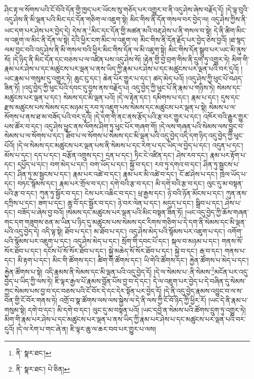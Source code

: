 ཤིང་རྟ་ལ་སོགས་པའི་ངོ་བོའི་དོན་གྱི་ཁྱད་པར་ཡོངས་སུ་གཅོད་པར་འགྱུར་བ་ནི་འདུ་ཤེས་ཞེས་བརྗོད་དོ། །དེ་ལྟ་བུའི་འདུ་ཤེས་ནི་མི་ལྡན་པའི་མིང་དང་དོན་གཅིག་ལ་འཇུག་སྟེ། མིང་གིས་ནི་དོན་གསལ་བར་བྱེད་ལ། འདུ་ཤེས་ཀྱིས་ནི་ཡང་དག་པར་ཤེས་པར་བྱེད་དེ། དེས་ན་\footnote{ནི་  སྣར་ཐང་། }མིང་དང་དོན་གྱི་མཚན་མའི་བརྡ་ཤེས་པ་ནི་གསལ་བ་སྟེ། དེ་ནི་ཚིག་མིང་ལ་འཇུག་ལ་མིང་ནི་དོན་ལ་སྟེ། དེའི་ཕྱིར་ངག་མིང་ལ་འཇུག་ལ། མིང་གིས་ནི་དོན་རྗོད་པར་བྱེད་ཅེས་བྱའོ། །ཐ་སྙད་ལམ་བྱང་བའི་འདུ་ཤེས་ནི་མི་གསལ་བའི་ཕྱིར་མིང་གིས་དོན་ལ་མི་འཇུག་སྟེ། མིང་གིས་དོན་སྒྲུབ་པར་ཡང་མི་ནུས་སོ། །དེ་ཉིད་ནི་མིང་དོན་དང་བཅས་པ་ལ་འཛིན་པས་འདུ་ཤེས་སོ། །རྟེན་གྱི་བྱེ་བྲག་གིས་ནི་དྲུག་ཏུ་འགྱུར་ཏེ། མིག་གི་རྣམ་པར་ཤེས་པ་དང་མཚུངས་པར་ལྡན་པ་ནས་ཡིད་ཀྱི་རྣམ་པར་ཤེས་པ་དང་མཚུངས་པར་ལྡན་པའི་བར་དུའོ། །ཡང་རྣམ་པ་གསུམ་དུ་འགྱུར་ཏེ། ཆུང་ངུ་དང་། ཆེན་པོར་གྱུར་པ་དང་། ཚད་མེད་པའོ། །འདུ་ཤེས་ཀྱི་ཕུང་པོ་བཤད་ཟིན་ཏོ། །འདུ་བྱེད་ཀྱི་ཕུང་པོའི་དབང་དུ་བྱས་ནས་བརྗོད་པ། འདུ་བྱེད་ཀྱི་ཕུང་པོ་ནི་རྣམ་པ་གཉིས་ཏེ། སེམས་དང་མཚུངས་པར་ལྡན་པ་དང་། སེམས་དང་མི་ལྡན་པའོ། །དེ་ལ་རྟེན་དང་། དམིགས་པ་དང་། རྣམ་པ་དང་། དུས་དང་རྫས་མཚུངས་པས་སེམས་དང་མཉམ་དུ་རབ་ཏུ་འཇུག་པས་སེམས་དང་མཚུངས་པར་ལྡན་པ་སྟེ། སེམས་པ་ལ་སོགས་པ་ནས་ཐ་མ་བཟོད་པའི་བར་དུའོ། །དེ་དག་གི་ནང་ནས་རྩོད་པའི་རྩ་བར་གྱུར་པ་དང་། འཁོར་བའི་རྒྱུར་གྱུར་པས་ཚོར་བ་དང་། འདུ་ཤེས་ཕྱུང་ནས་ལོགས་ཤིག་ཏུ་ཕུང་པོར་གཞག་གོ། །དེ་ལས་གཞན་པའི་སེམས་ལས་བྱུང་བ་སེམས་པ་ལ་སོགས་པ་དང་། ཐོབ་པ་ལ་སོགས་པ་སེམས་དང་མི་ལྡན་པའི་འདུ་བྱེད་འདི་དག་ཉིད་འདུ་བྱེད་ཀྱི་ཕུང་པོའོ། །དེ་ལ་སེམས་དང་མཚུངས་པར་ལྡན་པས་ནི་སེམས་པ་དང་རེག་པ་དང་ཡིད་ལ་བྱེད་པ་དང་། འདུན་པ་དང་། མོས་པ་དང་། དད་པ་དང་། བརྩོན་འགྲུས་དང་། དྲན་པ་དང་། ཏིང་ངེ་འཛིན་དང་། ཤེས་རབ་དང་། རྣམ་པར་རྟོག་པ་དང་། དཔྱོད་པ་དང་། བག་མེད་པ་དང་། བག་ཡོད་པ་དང་། སྐྱོ་བ་དང་། རབ་ཏུ་དགའ་བ་དང་། ཤིན་ཏུ་སྦྱངས་པ་དང་། ཤིན་ཏུ་མ་སྦྱངས་པ་དང་། རྣམ་པར་འཚེ་བ་དང་། རྣམ་པར་མི་འཚེ་བ་དང་། ངོ་ཚ་ཤེས་པ་དང་། ཁྲེལ་ཡོད་པ་དང་། བཏང་སྙོམས་དང་། རྣམ་པར་གྲོལ་བ་དང་། དགེ་བའི་རྩ་བ་དང་། མི་དགེ་བའི་རྩ་བ་དང་། ལུང་དུ་མ་བསྟན་པའི་རྩ་བ་དང་། ཀུན་ཏུ་སྦྱོར་བ་དང་། ངེས་པར་འཆིང་བ་དང་། ཕྲ་རྒྱས་དང་། ཉེ་བའི་ཉོན་མོངས་པ་དང་། ཀུན་ནས་དཀྲིས་པ་དང་། ཟག་པ་དང་། ཆུ་བོ་དང་སྦྱོར་བ་དང་། ཉེ་བར་ལེན་པ་དང་། མདུད་པ་དང་། སྒྲིབ་པ་དང་། ཤེས་པ་དང་། བཟོད་པ་ཞེས་བྱ་བའོ། །སེམས་དང་མཚུངས་པར་ལྡན་པའི་མིང་བསྟན་ཟིན་ཏོ། །ཡང་འདུ་བྱེད་ཀྱི་ཆོས་གཞན་གང་དག་གཟུགས་ཅན་མ་ཡིན་པ་ཉིད་དུ་མཚུངས་པས་སེམས་དང་རིགས་གཅིག་པ་དེ་དག་ནི་སེམས་དང་མི་ལྡན་པའི་འདུ་བྱེད་དེ། འདི་ལྟ་སྟེ། ཐོབ་པ་དང་། མ་ཐོབ་པ་དང་། འདུ་ཤེས་མེད་པའི་སྙོམས་པར་འཇུག་པ་དང་། འགོག་པའི་སྙོམས་པར་འཇུག་པ་དང་། འདུ་ཤེས་མེད་པ་དང་། སྲོག་གི་དབང་པོ་དང་། སྐལ་བ་མཉམ་པ་དང་། གནས་སོ་སོར་ཐོབ་པ་དང་། དངོས་པོ་སོ་སོར་ཐོབ་པ་དང་། སྐྱེ་མཆེད་སོ་སོར་ཐོབ་པ་དང་། སྐྱེ་བ་དང་། རྒ་བ་དང་། གནས་པ་དང་། མི་རྟག་པ་དང་། མིང་གི་ཚོགས་དང་། ཚིག་གི་ཚོགས་དང་། ཡི་གེའི་ཚོགས་དང་། རྐྱེན་ཚོགས་པ་མེད་པ་དང་། རྐྱེན་ཚོགས་པ་སྟེ། འདི་རྣམས་ནི་སེམས་དང་མི་ལྡན་པའི་འདུ་བྱེད་དོ། །དེ་ལ་སེམས་པ་:ནི་སེམས་\footnote{ནི་  སྣར་ཐང་།  པེ་ཅིན། }མངོན་པར་འདུ་བྱེད་པ་ཡིད་ཀྱི་ལས་ཏེ། ཇི་ལྟར་རྒྱལ་པོ་རྣམས་བློན་པོས་བྱ་བ་དེ་དང་། དེ་ལ་འཇུག་པར་བྱེད་པ་དེ་བཞིན་དུ་སེམས་ཀྱང་སེམས་པས་བྱ་བ་དང་བཅས་པའི་ངོ་བོར་དེ་དང་དེར་སྟོན་པར་བྱེད་དོ། །དེ་ནི་འདུ་བྱེད་རྣམས་འབྱུང་བ་ལ་ས་བོན་གྱི་ངོ་བོར་གནས་ཏེ། འགྲོ་བ་སྣ་ཚོགས་ལས་ལས་སྐྱེས་ལ་དེ་ནི་ལས་ཀྱི་ངོ་བོ་ཉིད་ཀྱི་ཕྱིར་རོ། །ཡང་དེ་ནི་རྣམ་པ་གསུམ་སྟེ། དགེ་བ་དང་། མི་དགེ་བ་དང་། ལུང་དུ་མ་བསྟན་པའོ། །ཡང་དབྱེ་ན་སེམས་པའི་ཚོགས་དྲུག་ཏུ་འགྱུར་ཏེ། མིག་གི་རྣམ་པར་ཤེས་པ་དང་མཚུངས་པར་ལྡན་པ་ནས་ཡིད་ཀྱི་རྣམ་པར་ཤེས་པ་དང་མཚུངས་པར་ལྡན་པའི་བར་དུའོ། །དེ་ལ་རེག་པ་གང་ཞེ་ན། ཇི་ལྟར་ཆུ་ལ་ཆར་བབ་པར་གྱུར་པ་ལས། 